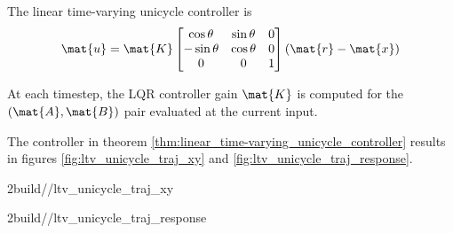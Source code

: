 \begin{theorem}
  The linear time-varying unicycle controller is
  \begin{equation}
    \mat{u} = \mat{K}
    \begin{bmatrix}
      \cos\theta & \sin\theta & 0 \\
      -\sin\theta & \cos\theta & 0 \\
      0 & 0 & 1
    \end{bmatrix}
    (\mat{r} - \mat{x})
  \end{equation}

  At each timestep, the LQR controller gain $\mat{K}$ is computed for the
  $(\mat{A}, \mat{B})$ pair evaluated at the current input.
\end{theorem}

The controller in theorem \ref{thm:linear_time-varying_unicycle_controller}
results in figures \ref{fig:ltv_unicycle_traj_xy} and
\ref{fig:ltv_unicycle_traj_response}.
\begin{bookfigure}
  \begin{minisvg}{2}{build/\chapterpath/ltv_unicycle_traj_xy}
    \caption{Linear time-varying unicycle controller x-y plot}
    \label{fig:ltv_unicycle_traj_xy}
  \end{minisvg}
  \hfill
  \begin{minisvg}{2}{build/\chapterpath/ltv_unicycle_traj_response}
    \caption{Linear time-varying unicycle controller response}
    \label{fig:ltv_unicycle_traj_response}
  \end{minisvg}
\end{bookfigure}
